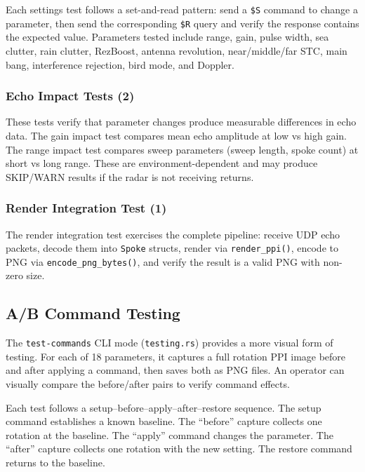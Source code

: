 \documentclass[11pt,letterpaper]{article}
\begin{document}
Each settings test follows a set-and-read pattern: send a \texttt{\$S} command to change a parameter, then send the corresponding \texttt{\$R} query and verify the response contains the expected value. Parameters tested include range, gain, pulse width, sea clutter, rain clutter, RezBoost, antenna revolution, near/middle/far STC, main bang, interference rejection, bird mode, and Doppler.

\subsubsection{Echo Impact Tests (2)}
\label{subsubsec:test-echo-impact}

These tests verify that parameter changes produce measurable differences in echo data. The gain impact test compares mean echo amplitude at low vs high gain. The range impact test compares sweep parameters (sweep length, spoke count) at short vs long range. These are environment-dependent and may produce SKIP/WARN results if the radar is not receiving returns.

\subsubsection{Render Integration Test (1)}
\label{subsubsec:test-render}

The render integration test exercises the complete pipeline: receive UDP echo packets, decode them into \texttt{Spoke} structs, render via \texttt{render\_ppi()}, encode to PNG via \texttt{encode\_png\_bytes()}, and verify the result is a valid PNG with non-zero size.

\subsection{A/B Command Testing}
\label{subsec:ab-testing}

The \texttt{test-commands} CLI mode (\texttt{testing.rs}) provides a more visual form of testing. For each of 18 parameters, it captures a full rotation PPI image before and after applying a command, then saves both as PNG files. An operator can visually compare the before/after pairs to verify command effects.

Each test follows a setup--before--apply--after--restore sequence. The setup command establishes a known baseline. The ``before'' capture collects one rotation at the baseline. The ``apply'' command changes the parameter. The ``after'' capture collects one rotation with the new setting. The restore command returns to the baseline.
\end{document}
